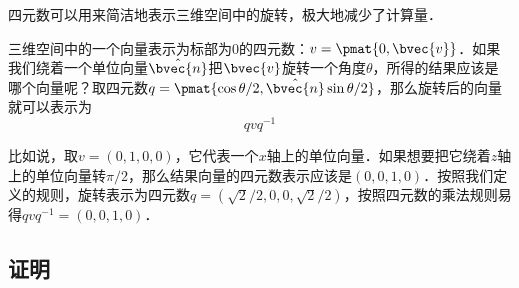 

四元数可以用来简洁地表示三维空间中的旋转，极大地减少了计算量．

三维空间中的一个向量表示为标部为$0$的四元数：$v=\pmat{0, \bvec{v}}$．如果我们绕着一个单位向量$\hat{\bvec{n}}$把$\bvec{v}$旋转一个角度$\theta$，所得的结果应该是哪个向量呢？取四元数$q=\pmat{\cos{\theta/2}, \hat{\bvec{n}}\sin{\theta/2}}$，那么旋转后的向量就可以表示为
\begin{equation}
qvq^{-1}
\end{equation}

比如说，取$v=(0, 1, 0, 0)$，它代表一个$x$轴上的单位向量．如果想要把它绕着$z$轴上的单位向量转$\pi/2$，那么结果向量的四元数表示应该是$(0, 0, 1, 0)$．按照我们定义的规则，旋转表示为四元数$q=(\sqrt{2}/2, 0, 0, \sqrt{2}/2)$，按照四元数的乘法规则易得$qvq^{-1}=(0,0,1,0)$．

\subsection{证明}









